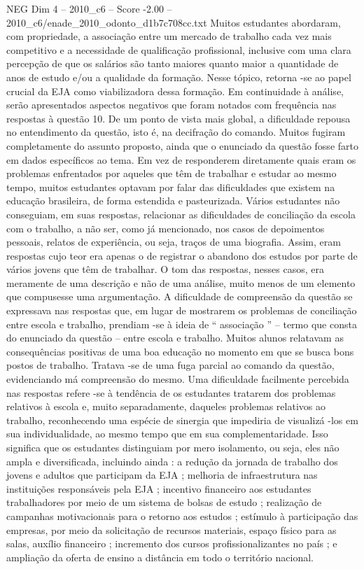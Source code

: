 \begin{textsample}{NEG Dim 4 – 2010\_c6 – Score -2.00 – 2010\_c6/enade\_2010\_odonto\_d1b7c708cc.txt}
Muitos estudantes abordaram, com propriedade, a associação entre um mercado de trabalho cada vez mais competitivo e a necessidade de qualificação profissional, inclusive com uma clara percepção de que os salários são tanto maiores quanto maior a quantidade de anos de estudo e/ou a qualidade da formação.
Nesse tópico, retorna -se ao papel crucial da EJA como viabilizadora dessa formação.
Em continuidade à análise, serão apresentados aspectos negativos que foram notados com frequência nas respostas à questão 10.
De um ponto de vista mais global, a dificuldade repousa no entendimento da questão, isto é, na decifração do comando.
Muitos fugiram completamente do assunto proposto, ainda que o enunciado da questão fosse farto em dados específicos ao tema.
Em vez de responderem diretamente quais eram os problemas enfrentados por aqueles que têm de trabalhar e estudar ao mesmo tempo, muitos estudantes optavam por falar das dificuldades que existem na educação brasileira, de forma estendida e pasteurizada.
Vários estudantes não conseguiam, em suas respostas, relacionar as dificuldades de conciliação da escola com o trabalho, a não ser, como já mencionado, nos casos de depoimentos pessoais, relatos de experiência, ou seja, traços de uma biografia.
Assim, eram respostas cujo teor era apenas o de registrar o abandono dos estudos por parte de vários jovens que têm de trabalhar.
O tom das respostas, nesses casos, era meramente de uma descrição e não de uma análise, muito menos de um elemento que compusesse uma argumentação.
A dificuldade de compreensão da questão se expressava nas respostas que, em lugar de mostrarem os problemas de conciliação entre escola e trabalho, prendiam -se à ideia de “ associação ” – termo que consta do enunciado da questão – entre escola e trabalho.
Muitos alunos relatavam as consequências positivas de uma boa educação no momento em que se busca bons postos de trabalho.
Tratava -se de uma fuga parcial ao comando da questão, evidenciando má compreensão do mesmo.
Uma dificuldade facilmente percebida nas respostas refere -se à tendência de os estudantes tratarem dos problemas relativos à escola e, muito separadamente, daqueles problemas relativos ao trabalho, reconhecendo uma espécie de sinergia que impediria de visualizá -los em sua individualidade, ao mesmo tempo que em sua complementaridade.
Isso significa que os estudantes distinguiam por mero isolamento, ou seja, eles não ampla e diversificada, incluindo ainda : a redução da jornada de trabalho dos jovens e adultos que participam da EJA ; melhoria de infraestrutura nas instituições responsáveis pela EJA ; incentivo financeiro aos estudantes trabalhadores por meio de um sistema de bolsas de estudo ; realização de campanhas motivacionais para o retorno aos estudos ; estímulo à participação das empresas, por meio da solicitação de recursos materiais, espaço físico para as salas, auxílio financeiro ; incremento dos cursos profissionalizantes no país ; e ampliação da oferta de ensino a distância em todo o território nacional.

\end{textsample}
